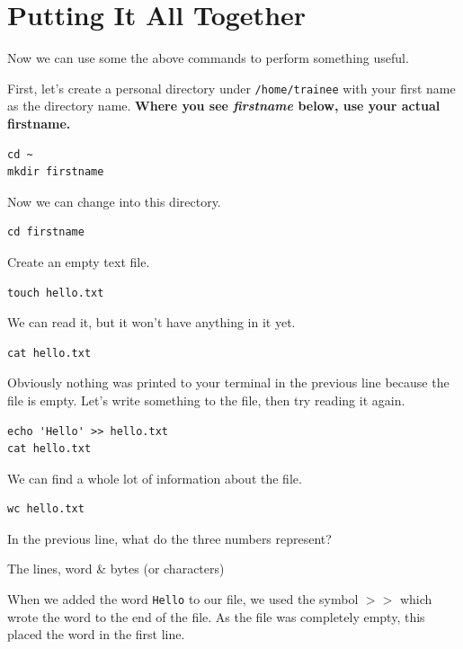 \section{Putting It All Together}
Now we can use some the above commands to perform something useful. \\

\begin{steps}
First, let's create a personal directory under \texttt{/home/trainee} with your first name as the directory name.
\textbf{Where you see \textit{firstname} below, use your actual firstname.}\\
\begin{lstlisting}
cd ~
mkdir firstname
\end{lstlisting}

Now we can change into this directory.
\begin{lstlisting}
cd firstname
\end{lstlisting}

Create an empty text file.
\begin{lstlisting}
touch hello.txt
\end{lstlisting}

We can read it, but it won't have anything in it yet.
\begin{lstlisting}
cat hello.txt
\end{lstlisting}

Obviously nothing was printed to your terminal in the previous line because the file is empty.
Let's write something to the file, then try reading it again.
\begin{lstlisting}
echo 'Hello' >> hello.txt
cat hello.txt
\end{lstlisting}

We can find a whole lot of information about the file.
\begin{lstlisting}
wc hello.txt
\end{lstlisting}
\end{steps}

\begin{questions}
In the previous line, what do the three numbers represent?
\begin{answer}
The lines, word \& bytes (or characters)
\end{answer}
\end{questions}

\begin{information}
When we added the word \texttt{Hello} to our file, we used the symbol $>>$ which wrote the word to the end of the file.
As the file was completely empty, this placed the word in the first line.
\end{information}

